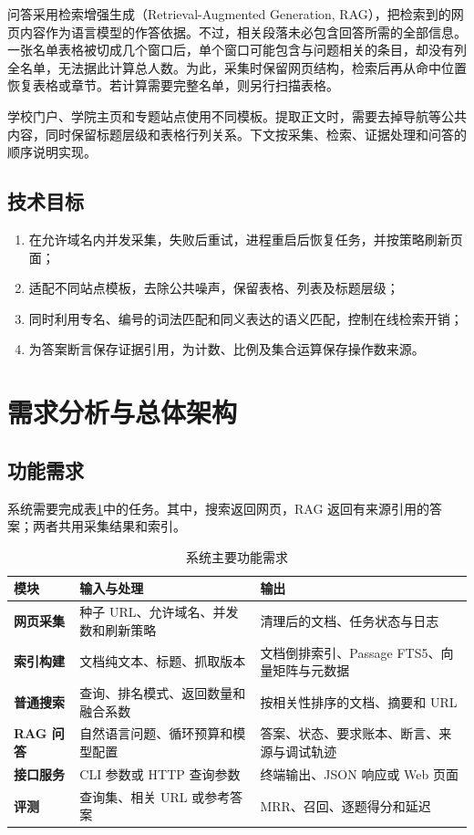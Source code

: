\documentclass[UTF8,zihao=-4,fontset=fandol]{ctexart}
\begin{document}
问答采用检索增强生成（Retrieval-Augmented Generation, RAG），把检索到的网页内容作为语言模型的作答依据\cite{lewis2020rag}。不过，相关段落未必包含回答所需的全部信息。一张名单表格被切成几个窗口后，单个窗口可能包含与问题相关的条目，却没有列全名单，无法据此计算总人数。为此，采集时保留网页结构，检索后再从命中位置恢复表格或章节。若计算需要完整名单，则另行扫描表格。

学校门户、学院主页和专题站点使用不同模板。提取正文时，需要去掉导航等公共内容，同时保留标题层级和表格行列关系。下文按采集、检索、证据处理和问答的顺序说明实现。

\subsection{技术目标}

\begin{enumerate}
  \item 在允许域名内并发采集，失败后重试，进程重启后恢复任务，并按策略刷新页面；
  \item 适配不同站点模板，去除公共噪声，保留表格、列表及标题层级；
  \item 同时利用专名、编号的词法匹配和同义表达的语义匹配，控制在线检索开销；
  \item 为答案断言保存证据引用，为计数、比例及集合运算保存操作数来源。
\end{enumerate}

\section{需求分析与总体架构}

\subsection{功能需求}

系统需要完成表\ref{tab:functional-requirements}中的任务。其中，搜索返回网页，RAG 返回有来源引用的答案；两者共用采集结果和索引。

\begin{table}[H]
\centering
\caption{系统主要功能需求}
\label{tab:functional-requirements}
\begin{tabularx}{\textwidth}{>{\bfseries}p{2.5cm}X X}
\toprule
模块 & 输入与处理 & 输出 \\
\midrule
网页采集 & 种子 URL、允许域名、并发数和刷新策略 & 清理后的文档、任务状态与日志 \\
索引构建 & 文档纯文本、标题、抓取版本 & 文档倒排索引、Passage FTS5、向量矩阵与元数据 \\
普通搜索 & 查询、排名模式、返回数量和融合系数 & 按相关性排序的文档、摘要和 URL \\
RAG 问答 & 自然语言问题、循环预算和模型配置 & 答案、状态、要求账本、断言、来源与调试轨迹 \\
接口服务 & CLI 参数或 HTTP 查询参数 & 终端输出、JSON 响应或 Web 页面 \\
评测 & 查询集、相关 URL 或参考答案 & MRR、召回、逐题得分和延迟 \\
\bottomrule
\end{tabularx}
\end{table}
\end{document}

